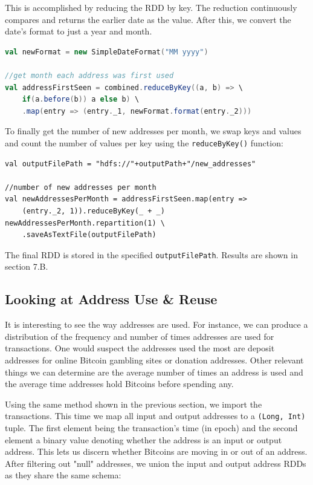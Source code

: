 \documentclass[9pt,twocolumn,twoside]{idsi}
\begin{document}
This is accomplished by reducing the RDD by key. The reduction continuously compares and returns the earlier date as the value. After this, we convert the date's format to just a year and month.

\begin{lstlisting}[language=Scala]
val newFormat = new SimpleDateFormat("MM yyyy")

//get month each address was first used
val addressFirstSeen = combined.reduceByKey((a, b) => \
    if(a.before(b)) a else b) \
    .map(entry => (entry._1, newFormat.format(entry._2)))
\end{lstlisting}

To finally get the number of new addresses per month, we swap keys and values and count the number of values per key using the \lstinline{reduceByKey()} function:

\begin{lstlisting}
val outputFilePath = "hdfs://"+outputPath+"/new_addresses"

//number of new addresses per month
val newAddressesPerMonth = addressFirstSeen.map(entry =>
    (entry._2, 1)).reduceByKey(_ + _)
newAddressesPerMonth.repartition(1) \
    .saveAsTextFile(outputFilePath)
\end{lstlisting}

The final RDD is stored in the specified \lstinline{outputFilePath}. Results are shown in section 7.B.

\subsection{Looking at Address Use \& Reuse}
It is interesting to see the way addresses are used. For instance, we can produce a distribution of the frequency and number of times addresses are used for transactions. One would suspect the addresses used the most are deposit addresses for online Bitcoin gambling sites or donation addresses. Other relevant things we can determine are the average number of times an address is used and the average time addresses hold Bitcoins before spending any.

Using the same method shown in the previous section, we import the transactions. This time we map all input and output addresses to a \lstinline{(Long, Int)} tuple. The first element being the transaction's time (in epoch) and the second element a binary value denoting whether the address is an input or output address. This lets us discern whether Bitcoins are moving in or out of an address. After filtering out "null" addresses, we union the input and output address RDDs as they share the same schema:
\end{document}
